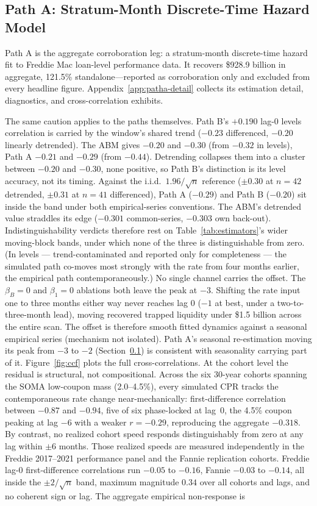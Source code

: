 \documentclass[12pt]{article}
\begin{document}
\subsection{Path A: Stratum-Month Discrete-Time Hazard Model}\label{sec:patha}

Path A is the aggregate corroboration leg: a stratum-month discrete-time hazard fit to Freddie Mac loan-level performance data. It recovers \$928.9 billion in aggregate, 121.5\% standalone---reported as corroboration only and excluded from every headline figure. Appendix~\ref{app:patha-detail} collects its estimation detail, diagnostics, and cross-correlation exhibits.

The same caution applies to the paths themselves. Path B's $+0.190$ lag-0 levels correlation is carried by the window's shared trend ($-0.23$ differenced, $-0.20$ linearly detrended). The ABM gives $-0.20$ and $-0.30$ (from $-0.32$ in levels), Path A $-0.21$ and $-0.29$ (from $-0.44$). Detrending collapses them into a cluster between $-0.20$ and $-0.30$, none positive, so Path B's distinction is its level accuracy, not its timing. Against the i.i.d.\ $1.96/\sqrt{n}$ reference ($\pm 0.30$ at $n = 42$ detrended, $\pm 0.31$ at $n = 41$ differenced), Path A ($-0.29$) and Path B ($-0.20$) sit inside the band under both empirical-series conventions. The ABM's detrended value straddles its edge ($-0.301$ common-series, $-0.303$ own back-out). Indistinguishability verdicts therefore rest on Table~\ref{tab:estimators}'s wider moving-block bands, under which none of the three is distinguishable from zero. (In levels --- trend-contaminated and reported only for completeness --- the simulated path co-moves most strongly with the rate from four months earlier, the empirical path contemporaneously.) No single channel carries the offset. The $\beta_B = 0$ and $\beta_1 = 0$ ablations both leave the peak at $-3$. Shifting the rate input one to three months either way never reaches lag 0 ($-1$ at best, under a two-to-three-month lead), moving recovered trapped liquidity under \$1.5 billion across the entire scan. The offset is therefore smooth fitted dynamics against a seasonal empirical series (mechanism not isolated). Path A's seasonal re-estimation moving its peak from $-3$ to $-2$ (Section~\ref{sec:patha}) is consistent with seasonality carrying part of it. Figure~\ref{fig:ccf} plots the full cross-correlations. At the cohort level the residual is structural, not compositional. Across the six 30-year cohorts spanning the SOMA low-coupon mass (2.0--4.5\%), every simulated CPR tracks the contemporaneous rate change near-mechanically: first-difference correlation between $-0.87$ and $-0.94$, five of six phase-locked at lag~0, the 4.5\% coupon peaking at lag $-6$ with a weaker $r=-0.29$, reproducing the aggregate $-0.318$. By contrast, no realized cohort speed responds distinguishably from zero at any lag within $\pm 6$ months. Those realized speeds are measured independently in the Freddie 2017--2021 performance panel and the Fannie replication cohorts. Freddie lag-0 first-difference correlations run $-0.05$ to $-0.16$, Fannie $-0.03$ to $-0.14$, all inside the $\pm 2/\sqrt{n}$ band, maximum magnitude $0.34$ over all cohorts and lags, and no coherent sign or lag. The aggregate empirical non-response is 
\end{document}

